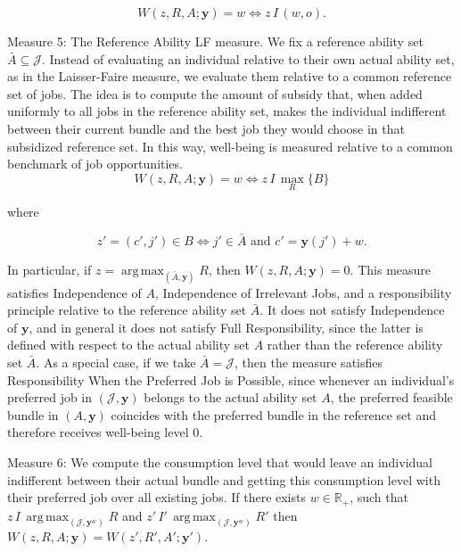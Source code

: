 \documentclass[12pt,thmsb]{article}
\DeclareMathOperator*{\argmax}{arg\,max}
\begin{document}
\begin{equation*}
\label{ }
W(z, R, A;\mathbf{y})=w\Leftrightarrow z\,I\,(w,o).
\end{equation*}


Measure 5: The Reference Ability LF measure. We fix a reference ability set $\bar{A}\subseteq \mathcal{J}$. Instead of evaluating an individual relative to their own actual ability set, as in the Laisser-Faire measure, we evaluate them relative to a common reference set of jobs. The idea is to compute the amount of subsidy that, when added uniformly to all jobs in the reference ability set, makes the individual indifferent between their current bundle and the best job they would choose in that subsidized reference set. In this way, well-being is measured relative to a common benchmark of job opportunities. 
\begin{equation*}
W(z,R,A;\mathbf{y})=w
\Leftrightarrow
z\,I\,\max_R\{B\}
\end{equation*}

where

\begin{equation*}
z'=(c',j')\in B
\Leftrightarrow
j'\in \bar{A}
\textrm{ and }
c'=\mathbf{y}(j')+w.
\end{equation*}

In particular, if $z=\argmax_{(\bar{A},\mathbf{y})}R$, then $W(z,R,A;\mathbf{y})=0$.
This measure satisfies Independence of $A$, Independence of Irrelevant Jobs, and a responsibility principle relative to the reference ability set $\bar{A}$. It does not satisfy Independence of $\mathbf{y}$, and in general it does not satisfy Full Responsibility, since the latter is defined with respect to the actual ability set $A$ rather than the reference ability set $\bar{A}$.  As a special case, if we take $\bar{A}=\mathcal{J}$, then the measure satisfies Responsibility When the Preferred Job is Possible, since whenever an individual's preferred job in $(\mathcal{J},\mathbf{y})$ belongs to the actual ability set $A$, the preferred feasible bundle in $(A,\mathbf{y})$ coincides with the preferred bundle in the reference set and therefore receives well-being level $0$.


Measure 6: We compute the consumption level that would leave an individual indifferent between their actual bundle and getting this consumption level with their preferred job over all existing jobs. If there exists $w\in\mathbb{R}_{+}$, such that $z\,I\,\argmax_{(\mathcal{J},\mathbf{y}^w)}R$ and $z'\,I'\,\argmax_{(\mathcal{J},\mathbf{y}^w)}R'$ then $W(z,R,A;\mathbf{y})=W(z',R',A';\mathbf{y}')$.
\end{document}
